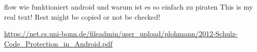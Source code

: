 flow wie funktioniert android und warum ist es so einfach zu piraten\newline
This is my real text! Rest might be copied or not be checked!


\url{https://net.cs.uni-bonn.de/fileadmin/user_upload/plohmann/2012-Schulz-Code_Protection_in_Android.pdf}\newline
